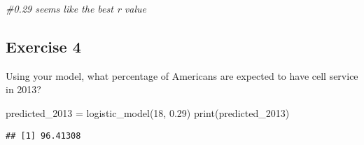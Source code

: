 \documentclass[
]{article}
\newenvironment{Shaded}{\begin{snugshade}}{\end{snugshade}}
\newcommand{\CommentTok}[1]{\textcolor[rgb]{0.56,0.35,0.01}{\textit{#1}}}
\newcommand{\DecValTok}[1]{\textcolor[rgb]{0.00,0.00,0.81}{#1}}
\newcommand{\FloatTok}[1]{\textcolor[rgb]{0.00,0.00,0.81}{#1}}
\newcommand{\FunctionTok}[1]{\textcolor[rgb]{0.00,0.00,0.00}{#1}}
\newcommand{\NormalTok}[1]{#1}
\newcommand{\OtherTok}[1]{\textcolor[rgb]{0.56,0.35,0.01}{#1}}
\begin{document}
\begin{Shaded}
\begin{Highlighting}[]
\CommentTok{\#0.29 seems like the best r value}
\end{Highlighting}
\end{Shaded}

\hypertarget{exercise-4}{%
\subsection{Exercise 4}\label{exercise-4}}

Using your model, what percentage of Americans are expected to have cell
service in 2013?

\begin{Shaded}
\begin{Highlighting}[]
\NormalTok{predicted\_2013 }\OtherTok{=} \FunctionTok{logistic\_model}\NormalTok{(}\DecValTok{18}\NormalTok{, }\FloatTok{0.29}\NormalTok{)}
\FunctionTok{print}\NormalTok{(predicted\_2013)}
\end{Highlighting}
\end{Shaded}

\begin{verbatim}
## [1] 96.41308
\end{verbatim}
\end{document}
